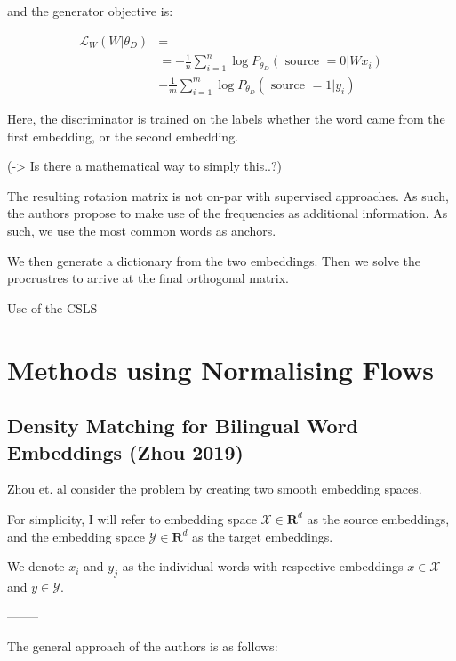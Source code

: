 \documentclass[a4paper,12pt,twoside,openright]{report}
\begin{document}
and the generator objective is:

\begin{align}
\mathcal{L}_W(W|\theta_D) &= \\
&= -\frac{1}{n} \sum_{i=1}^{n} \log P_{\theta_{D}}\left(\text { source }=0 | W x_{i}\right) \\ 
&-  \frac{1}{m} \sum_{i=1}^{m} \log P_{\theta_{D}}\left(\text { source }=1 | y_{i}\right)
\end{align}

Here, the discriminator is trained on the labels whether the word came from the first embedding, or the second embedding.

(-> Is there a mathematical way to simply this..?)

The resulting rotation matrix is not on-par with supervised approaches.
As such, the authors propose to make use of the frequencies as additional information.
As such, we use the most common words as anchors.

We then generate a dictionary from the two embeddings.
Then we solve the procrustres to arrive at the final orthogonal matrix.

Use of the CSLS













\section{Methods using Normalising Flows}

\subsection{Density Matching for Bilingual Word Embeddings (Zhou 2019)}

Zhou et. al consider the problem by creating two smooth embedding spaces.

For simplicity, I will refer to embedding space $\mathcal{X} \in \mathbf{R}^d$ as the source embeddings, and the embedding space $\mathcal{Y} \in \mathbf{R}^d$ as the target embeddings. 

We denote $ x_i $ and $y_j$ as the individual words with respective embeddings $x \in \mathcal{X}$ and $y \in \mathcal{Y}$.

--------

The general approach of the authors is as follows:
\end{document}
